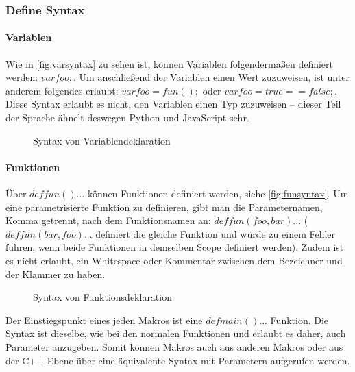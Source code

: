     \subsubsection{Define Syntax}
    \label{sssec:Define Syntax}
      \paragraph{Variablen}
        Wie in \autoref{fig:varsyntax} zu sehen ist, können Variablen folgendermaßen definiert werden: \myMIn$var foo;$. Um anschließend der Variablen einen Wert zuzuweisen, ist unter anderem folgendes erlaubt: \myMIn$var foo = fun();$ oder \myMIn$var foo = true == false;$. Diese Syntax erlaubt es nicht, den Variablen einen Typ zuzuweisen -- dieser Teil der Sprache ähnelt deswegen Python und JavaScript sehr.
        \begin{figure}[H]
          \centering
          \caption{Syntax von Variablendeklaration}
          \label{fig:varsyntax}
        \end{figure}

      \paragraph{Funktionen}
        Über \myMIn$def fun(){...}$ können Funktionen definiert werden, siehe \autoref{fig:funsyntax}. Um eine parametrisierte Funktion zu definieren, gibt man die Parameternamen, Komma getrennt, nach dem Funktionsnamen an: \myMIn$def fun(foo, bar){...}$ (\myMIn$def fun(bar, foo){...}$ definiert die gleiche Funktion und würde zu einem Fehler führen, wenn beide Funktionen in demselben Scope definiert werden). Zudem ist es nicht erlaubt, ein Whitespace oder Kommentar zwischen dem Bezeichner und der Klammer zu haben.
        \begin{figure}[H]
          \centering
          \caption{Syntax von Funktionsdeklaration}
          \label{fig:funsyntax}
        \end{figure}
        Der Einstiegspunkt eines jeden Makros ist eine \myMIn$def main(){...}$ Funktion. Die Syntax ist dieselbe, wie bei den normalen Funktionen und erlaubt es daher, auch Parameter anzugeben. Somit können Makros auch aus anderen Makros oder aus der C++ Ebene über eine äquivalente Syntax mit Parametern aufgerufen werden.

